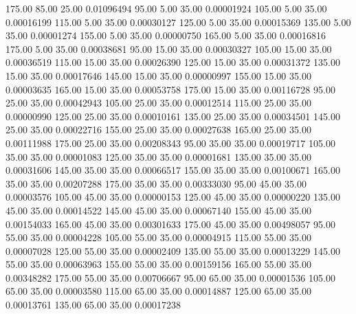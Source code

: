     175.00     85.00     25.00     0.01096494
     95.00      5.00     35.00     0.00001924
    105.00      5.00     35.00     0.00016199
    115.00      5.00     35.00     0.00030127
    125.00      5.00     35.00     0.00015369
    135.00      5.00     35.00     0.00001274
    155.00      5.00     35.00     0.00000750
    165.00      5.00     35.00     0.00016816
    175.00      5.00     35.00     0.00038681
     95.00     15.00     35.00     0.00030327
    105.00     15.00     35.00     0.00036519
    115.00     15.00     35.00     0.00026390
    125.00     15.00     35.00     0.00031372
    135.00     15.00     35.00     0.00017646
    145.00     15.00     35.00     0.00000997
    155.00     15.00     35.00     0.00003635
    165.00     15.00     35.00     0.00053758
    175.00     15.00     35.00     0.00116728
     95.00     25.00     35.00     0.00042943
    105.00     25.00     35.00     0.00012514
    115.00     25.00     35.00     0.00000990
    125.00     25.00     35.00     0.00010161
    135.00     25.00     35.00     0.00034501
    145.00     25.00     35.00     0.00022716
    155.00     25.00     35.00     0.00027638
    165.00     25.00     35.00     0.00111988
    175.00     25.00     35.00     0.00208343
     95.00     35.00     35.00     0.00019717
    105.00     35.00     35.00     0.00001083
    125.00     35.00     35.00     0.00001681
    135.00     35.00     35.00     0.00031606
    145.00     35.00     35.00     0.00066517
    155.00     35.00     35.00     0.00100671
    165.00     35.00     35.00     0.00207288
    175.00     35.00     35.00     0.00333030
     95.00     45.00     35.00     0.00003576
    105.00     45.00     35.00     0.00000153
    125.00     45.00     35.00     0.00000220
    135.00     45.00     35.00     0.00014522
    145.00     45.00     35.00     0.00067140
    155.00     45.00     35.00     0.00154033
    165.00     45.00     35.00     0.00301633
    175.00     45.00     35.00     0.00498057
     95.00     55.00     35.00     0.00004228
    105.00     55.00     35.00     0.00004915
    115.00     55.00     35.00     0.00007028
    125.00     55.00     35.00     0.00002409
    135.00     55.00     35.00     0.00013229
    145.00     55.00     35.00     0.00063963
    155.00     55.00     35.00     0.00159156
    165.00     55.00     35.00     0.00348282
    175.00     55.00     35.00     0.00706667
     95.00     65.00     35.00     0.00001536
    105.00     65.00     35.00     0.00003580
    115.00     65.00     35.00     0.00014887
    125.00     65.00     35.00     0.00013761
    135.00     65.00     35.00     0.00017238
